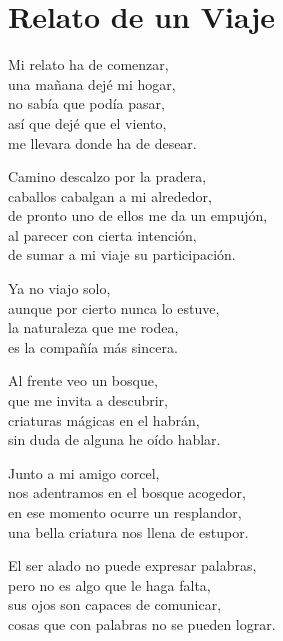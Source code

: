 \section*{Relato de un Viaje}
\label{RelatoViaje}

\vspace{1em}
\begin{center}
Mi relato ha de comenzar,\\ 
una mañana dejé mi hogar,\\ 
no sabía que podía pasar,\\ 
así que dejé que el viento,\\ 
me llevara donde ha de desear.

\vspace{1em} 
Camino descalzo por la pradera,\\ 
caballos cabalgan a mi alrededor,\\ 
de pronto uno de ellos me da un empujón,\\ 
al parecer con cierta intención,\\ 
de sumar a mi viaje su participación.

\vspace{1em} 
Ya no viajo solo, \\ 
aunque por cierto nunca lo estuve,\\ 
la naturaleza que me rodea,\\ 
es la compañía más sincera.

\vspace{1em} 
Al frente veo un bosque,\\ 
que me invita a descubrir,\\ 
criaturas mágicas en el habrán,\\ 
sin duda de alguna he oído hablar.

\vspace{1em} 
Junto a mi amigo corcel,\\ 
nos adentramos en el bosque acogedor,\\ 
en ese momento ocurre un resplandor,\\ 
una bella criatura nos llena de estupor.

\vspace{1em} 
El ser alado no puede expresar palabras,\\ 
pero no es algo que le haga falta,\\ 
sus ojos son capaces de comunicar,\\ 
cosas que con palabras no se pueden lograr.


\end{center}
